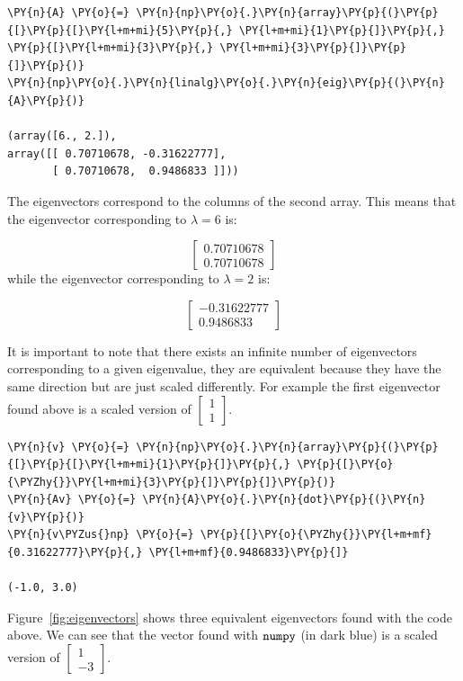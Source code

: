 \begin{tcolorbox}[breakable, size=fbox, boxrule=1pt, pad at break*=1mm,colback=cellbackground, colframe=cellborder]
\begin{Verbatim}[commandchars=\\\{\}]
\PY{n}{A} \PY{o}{=} \PY{n}{np}\PY{o}{.}\PY{n}{array}\PY{p}{(}\PY{p}{[}\PY{p}{[}\PY{l+m+mi}{5}\PY{p}{,} \PY{l+m+mi}{1}\PY{p}{]}\PY{p}{,} \PY{p}{[}\PY{l+m+mi}{3}\PY{p}{,} \PY{l+m+mi}{3}\PY{p}{]}\PY{p}{]}\PY{p}{)}
\PY{n}{np}\PY{o}{.}\PY{n}{linalg}\PY{o}{.}\PY{n}{eig}\PY{p}{(}\PY{n}{A}\PY{p}{)}
	
(array([6., 2.]),
array([[ 0.70710678, -0.31622777],
       [ 0.70710678,  0.9486833 ]]))
\end{Verbatim}
\end{tcolorbox}
The eigenvectors correspond to the columns of the second array. This
means that the eigenvector corresponding to \(\lambda=6\) is:

\[\begin{bmatrix}
0.70710678 \\
0.70710678\end{bmatrix}\]
while the eigenvector corresponding to \(\lambda=2\) is:

\[\begin{bmatrix}
−0.31622777 \\
0.9486833\end{bmatrix}\]

It is important to note that there exists an infinite number of 
eigenvectors corresponding to a given eigenvalue, they are equivalent
because they have the same direction but are just scaled differently.
For example the first eigenvector found above is a scaled version of
\(\begin{bmatrix}1\\ 1\end{bmatrix}\).

\begin{tcolorbox}[breakable, size=fbox, boxrule=1pt, pad at break*=1mm,colback=cellbackground, colframe=cellborder]
\begin{Verbatim}[commandchars=\\\{\}]
\PY{n}{v} \PY{o}{=} \PY{n}{np}\PY{o}{.}\PY{n}{array}\PY{p}{(}\PY{p}{[}\PY{p}{[}\PY{l+m+mi}{1}\PY{p}{]}\PY{p}{,} \PY{p}{[}\PY{o}{\PYZhy{}}\PY{l+m+mi}{3}\PY{p}{]}\PY{p}{]}\PY{p}{)}
\PY{n}{Av} \PY{o}{=} \PY{n}{A}\PY{o}{.}\PY{n}{dot}\PY{p}{(}\PY{n}{v}\PY{p}{)}
\PY{n}{v\PYZus{}np} \PY{o}{=} \PY{p}{[}\PY{o}{\PYZhy{}}\PY{l+m+mf}{0.31622777}\PY{p}{,} \PY{l+m+mf}{0.9486833}\PY{p}{]}	
	
(-1.0, 3.0)
\end{Verbatim}
\end{tcolorbox}
Figure~\ref{fig:eigenvectors} shows three equivalent eigenvectors found
with the code above. We can see that the vector found with \(\tt{numpy}\) (in dark blue) is a scaled version of \(\begin{bmatrix}1\\ -3\end{bmatrix}\).

